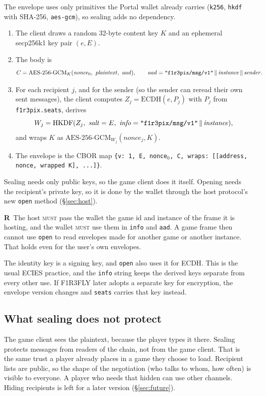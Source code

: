 \documentclass[11pt,a4paper]{article}
\newcommand{\code}[1]{\texttt{#1}}
\newcommand{\MUST}{\textsc{must}}
\newcounter{req}
\newcommand{\req}[1]{\refstepcounter{req}\label{#1}\textbf{R\thereq}}
\begin{document}
The envelope uses only primitives the Portal wallet already carries (\code{k256},
\code{hkdf} with SHA-256, \code{aes-gcm}), so sealing adds no dependency.

\begin{enumerate}[leftmargin=1.4em,itemsep=2pt]
\item The client draws a random 32-byte content key $K$ and an ephemeral secp256k1 key pair
  $(e,E)$.
\item The body is
  \[C=\mathrm{AES\text{-}256\text{-}GCM}_K(\mathit{nonce}_0,\ \mathit{plaintext},\ \mathit{aad}),\qquad
    \mathit{aad} = \text{\code{"f1r3pix/msg/v1"}}\,\|\,\mathit{instance}\,\|\,\mathit{sender}.\]
\item For each recipient $j$, and for the sender (so the sender can reread their own sent
  messages), the client computes $Z_j=\mathrm{ECDH}(e, P_j)$ with $P_j$ from
  \code{f1r3pix.seats}, derives
  \[W_j=\mathrm{HKDF}(Z_j,\ \mathit{salt}=E,\ \mathit{info}=\text{\code{"f1r3pix/msg/v1"}}\,\|\,\mathit{instance}),\]
  and wraps $K$ as $\mathrm{AES\text{-}256\text{-}GCM}_{W_j}(\mathit{nonce}_j, K)$.
\item The envelope is the CBOR map \code{\{v: 1, E, nonce$_0$, C, wraps: [[address, nonce, wrapped K], ...]\}}.
\end{enumerate}

Sealing needs only public keys, so the game client does it itself. Opening needs the
recipient's private key, so it is done by the wallet through the host protocol's new
\code{open} method (\S\ref{sec:host}).

\req{r:open-scope}~The host \MUST{} pass the wallet the game id and instance of the frame it is
hosting, and the wallet \MUST{} use them in \code{info} and \code{aad}. A game frame then cannot
use \code{open} to read envelopes made for another game or another instance. That holds even
for the user's own envelopes.

The identity key is a signing key, and \code{open} also uses it for ECDH. This is the usual
ECIES practice, and the \code{info} string keeps the derived keys separate from every other use.
If F1R3FLY later adopts a separate key for encryption, the envelope version changes and
\code{seats} carries that key instead.

\subsection{What sealing does not protect}

The game client sees the plaintext, because the player types it there. Sealing protects
messages from readers of the chain, not from the game client. That is the same trust a player
already places in a game they choose to load. Recipient lists are public, so the shape of the
negotiation (who talks to whom, how often) is visible to everyone. A player who needs that
hidden can use other channels. Hiding recipients is left for a later version
(\S\ref{sec:future}).
\end{document}
